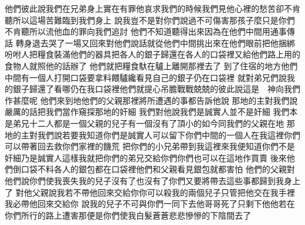 他們彼此說\chientien 我們在兄弟身上實在有罪\chientien 他哀求我們的時候\chientien 我們見他心裡的愁苦\chientien 卻不肯聽\chientien 所以這場苦難臨到我們身上\chuan 
{}說\chientien 我豈不是對你們說過\chientien 不可傷害那孩子麼\chientien 只是你們不肯聽\chientien 所以流他血的罪向我們追討\chuan 
{}他們不知道聽得出來\chientien 因為在他們中間用通事傳話\chuan 
{}轉身退去\chientien 哭了一場\chientien 又回來對他們說話\chientien 就從他們中間挑出來\chientien 在他們眼前把他捆綁\chuan 
{}吩咐人把糧食裝滿他們的器具\chientien 把各人的銀子歸還在各人的口袋裡\chientien 又給他們路上用的食物\chientien 人就照他的話辦了\chuan\Chuan
{}他們就把糧食馱在驢上\chientien 離開那裡去了\chuan 
{}到了住宿的地方\chientien 他們中間有一個人打開口袋\chientien 要拿料餵驢\chientien 纔看見自己的銀子仍在口袋裡\yuentien 
{}就對弟兄們說\chientien 我的銀子歸還了\chientien 看哪\chientien 仍在我口袋裡\yuentien 他們就提心吊膽\chientien 戰戰兢兢的彼此說\chientien 這是　神向我們作甚麼呢\chuan 
{}他們來到地他們的父親那裡\chientien 將所遭遇的事都告訴他\chientien 說\chientien 
{}那地的主對我們說嚴厲的話\chientien 把我們當作窺探那地的奸細\chuan 
{}我們對他說\chientien 我們是誠實人\chientien 並不是奸細\yuentien 
{}我們本是弟兄十二人\chientien 都是一個父親的兒子\chientien 有一個沒有了\chientien 頂小的如今同我們的父親在地\chuan 
{}那地的主對我們說\chientien 若要我知道你們是誠實人\chientien 可以留下你們中間的一個人在我這裡\chientien 你們可以帶著回去\chientien 救你們家裡的饑荒\yuentien 
{}把你們的小兄弟帶到我這裡來\chientien 我便知道你們不是奸細\chientien 乃是誠實人\yuentien 這樣\chientien 我就把你們的弟兄交給你們\chientien 你們也可以在這地作買賣\chuan\Chuan
{}後來他們倒口袋\chientien 不料各人的銀包都在口袋裡\chientien 他們和父親看見銀包就都害怕\chuan 
{}他們的父親對他們說\chientien 你們使我喪失我的兒子\yuentien{}沒有了\chientien{}也沒有了\chientien 你們又要將帶去\yuentien 這些事都歸到我身上了\chuan 
{}對他父親說\chientien 我若不帶他回來交給你\chientien 你可以殺我的兩個兒子\chientien 只管把他交在我手裡\chientien 我必帶他回來交給你\chuan 
{}說\chientien 我的兒子不可與你們一同下去\yuentien 他哥哥死了\chientien 只剩下他\chientien 他若在你們所行的路上遭害\chientien 那便是你們使我白髮蒼蒼\chientien 悲悲慘慘的下陰間去了\chuan 
